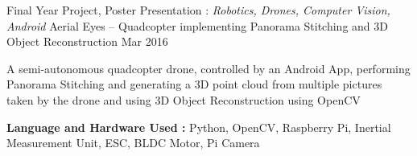 \begin{cventries}
  \cventry
    {Final Year Project, Poster Presentation : \textit{Robotics, Drones, Computer Vision, Android}} %
    {Aerial Eyes – Quadcopter implementing Panorama Stitching and 3D Object Reconstruction} %
    {} %
    {Mar 2016} %
    {
      \begin{cvitems}
      \item{A semi-autonomous quadcopter drone, controlled by an Android App, performing Panorama Stitching and generating a 3D point cloud from multiple pictures taken by the drone and using 3D Object Reconstruction using OpenCV}
      \item{\textbf{Language and Hardware Used :} Python, OpenCV, Raspberry Pi, Inertial Measurement Unit, ESC, BLDC Motor, Pi Camera}
      \end{cvitems}
    }



\end{cventries}
